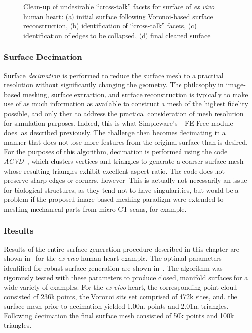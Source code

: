 \begin{figure}
{\label{fig:cross2-4}}		
%
\caption{Clean-up of undesirable ``cross-talk'' facets for surface of \textit{ex vivo} human heart: (a) initial surface following Voronoi-based surface reconstruction, (b) identification of ``cross-talk'' facets, (c) identification of edges to be collapsed, (d) final cleaned surface}
\label{fig:cross2}
\end{figure}

\subsubsection{Surface Decimation}

Surface \textit{decimation} is performed to reduce the surface mesh to a practical resolution without significantly changing the geometry. The philosophy in image-based meshing, surface extraction, and surface reconstruction is typically to make use of as much information as available to construct a mesh of the highest fidelity possible, and only then to address the practical consideration of mesh resolution for simulation purposes. Indeed, this is what Simpleware's {+FE Free} module does, as described previously. The challenge then becomes decimating in a manner that does not lose more features from the original surface than is desired. For the purposes of this algorithm, decimation is performed using the code \textit{ACVD}~\cite{valette_2004, valette_2008}, which clusters vertices and triangles to generate a coarser surface mesh whose resulting triangles exhibit excellent aspect ratio. The code does not preserve sharp edges or corners, however. This is actually not necessarily an issue for biological structures, as they tend not to have singularities, but would be a problem if the proposed image-based meshing paradigm were extended to meshing mechanical parts from micro-CT scans, for example.

\subsubsection{Results}

Results of the entire surface generation procedure described in this chapter are shown in~ for the \textit{ex vivo} human heart example. The optimal parameters identified for robust surface generation are shown in~. The algorithm was rigorously tested with these parameters to produce closed, manifold surfaces for a wide variety of examples. For the \textit{ex vivo} heart, the corresponding point cloud consisted of 236k points, the Voronoi site set comprised of 472k sites, and. the surface mesh prior to decimation yielded 1.00m points and 2.01m triangles. Following decimation the final surface mesh consisted of 50k points and 100k triangles.

